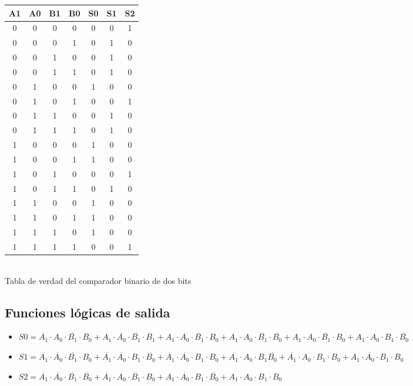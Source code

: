\begin{center}
\centering
\begin{tabular}{c c c c || c c c}
A1 & A0 & B1 & B0 & S0 & S1 & S2 \\
\hline
0 & 0 & 0 & 0 & 0 & 0 & 1 \\
0 & 0 & 0 & 1 & 0 & 1 & 0 \\
0 & 0 & 1 & 0 & 0 & 1 & 0 \\
0 & 0 & 1 & 1 & 0 & 1 & 0 \\
0 & 1 & 0 & 0 & 1 & 0 & 0 \\
0 & 1 & 0 & 1 & 0 & 0 & 1 \\
0 & 1 & 1 & 0 & 0 & 1 & 0 \\
0 & 1 & 1 & 1 & 0 & 1 & 0 \\
1 & 0 & 0 & 0 & 1 & 0 & 0 \\
1 & 0 & 0 & 1 & 1 & 0 & 0 \\
1 & 0 & 1 & 0 & 0 & 0 & 1 \\
1 & 0 & 1 & 1 & 0 & 1 & 0 \\
1 & 1 & 0 & 0 & 1 & 0 & 0 \\
1 & 1 & 0 & 1 & 1 & 0 & 0 \\
1 & 1 & 1 & 0 & 1 & 0 & 0 \\
1 & 1 & 1 & 1 & 0 & 0 & 1 \\
\end{tabular}
\\Tabla de verdad del comparador binario de dos bits
\end{center}


\subsection{Funciones lógicas de salida}
\begin{itemize}
    \item $S0 = \overline{A_1} \cdot A_0 \cdot \overline{B_1} \cdot \overline{B_0} + A_1 \cdot \overline{A_0} \cdot \overline{B_1} \cdot \overline{B_1} + A_1 \cdot \overline{A_0} \cdot \overline{B_1} \cdot B_0 + A_1 \cdot A_0 \cdot \overline{B_1} \cdot \overline{B_0} + A_1 \cdot A_0 \cdot \overline{B_1} \cdot B_0 + A_1 \cdot A_0 \cdot B_1 \cdot \overline{B_0}$
    \item $S1 = \overline{A_1} \cdot \overline{A_0} \cdot \overline{B_1} \cdot B_0 + \overline{A_1} \cdot \overline{A_0} \cdot B_1 \cdot \overline{B_0} + \overline{A_1} \cdot \overline{A_0} \cdot B_1 \cdot B_0 + \overline{A_1} \cdot A_0 \cdot B_1 \overline{B_0} + \overline{A_1} \cdot A_0 \cdot B_1 \cdot B_0 + A_1 \cdot \overline{A_0} \cdot B_1 \cdot B_0 $ 
    \item $S2 = \overline{A_1} \cdot \overline{A_0} \cdot \overline{B_1} \cdot \overline{B_0} + \overline{A_1} \cdot A_0 \cdot \overline{B_1} \cdot B_0 + A_1 \cdot \overline{A_0} \cdot B_1 \cdot \overline{B_0} + A_1 \cdot A_0 \cdot B_1 \cdot B_0 $
\end{itemize}


